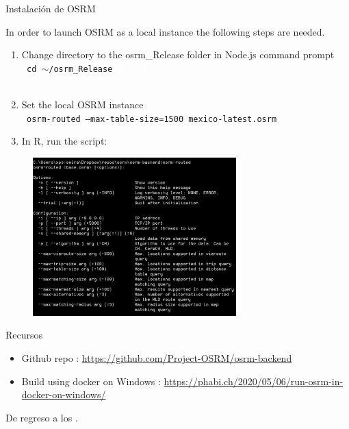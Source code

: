 \documentclass[8pt]{beamer}
\begin{document}
\begin{frame}[allowframebreaks]{Instalación de OSRM}
    
In order to launch OSRM as a local instance the following steps are needed.
    \begin{enumerate}
        \item Change directory to the osrm\_Release folder in  Node.js command prompt\\
        
        \texttt{         cd $\sim$/osrm\_Release}
        \textcolor{white}{      cd C:/Users/xps-seira/Dropbox/repos/osrm/osrm-backend      }

        \item Set the local OSRM instance\\
        
        \texttt{         osrm-routed --max-table-size=1500 mexico-latest.osrm }
        \item In R, run the script:
    \end{enumerate}
    


\framebreak


\begin{figure}[H]
    \begin{center}
        \includegraphics[width=0.7\textwidth]{Figuras/osrm.pdf}
        \end{center}
\end{figure}
\end{frame}

\begin{frame}{Recursos}
\begin{itemize}
    \item Github repo : \href{https://github.com/Project-OSRM/osrm-backend}{https://github.com/Project-OSRM/osrm-backend}
    \item Build using docker on Windows : \href{https://phabi.ch/2020/05/06/run-osrm-in-docker-on-windows/}{https://phabi.ch/2020/05/06/run-osrm-in-docker-on-windows/}
\end{itemize}

\vspace{15mm}
De regreso a los \hyperlink{inst}{}.

\end{frame}
\end{document}
